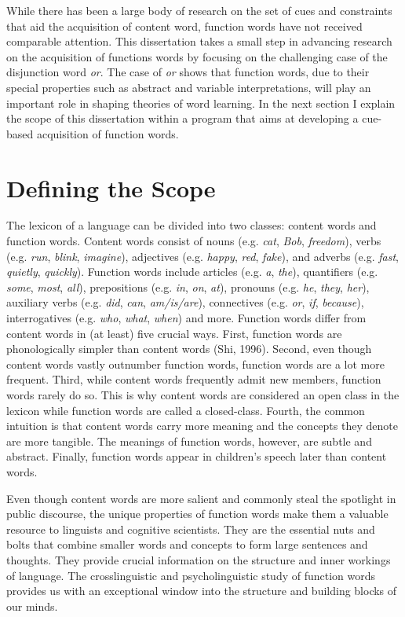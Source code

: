 \documentclass[oneside]{report}
\theoremstyle{definition}
\theoremstyle{definition}
\theoremstyle{definition}
\theoremstyle{remark}
\begin{document}
While there has been a large body of research on the set of cues and
constraints that aid the acquisition of content word, function words
have not received comparable attention. This dissertation takes a small
step in advancing research on the acquisition of functions words by
focusing on the challenging case of the disjunction word \emph{or}. The
case of \emph{or} shows that function words, due to their special
properties such as abstract and variable interpretations, will play an
important role in shaping theories of word learning. In the next section
I explain the scope of this dissertation within a program that aims at
developing a cue-based acquisition of function words.

\section{Defining the Scope}\label{defining-the-scope}

The lexicon of a language can be divided into two classes: content words
and function words. Content words consist of nouns (e.g. \emph{cat},
\emph{Bob}, \emph{freedom}), verbs (e.g. \emph{run}, \emph{blink},
\emph{imagine}), adjectives (e.g. \emph{happy}, \emph{red},
\emph{fake}), and adverbs (e.g. \emph{fast}, \emph{quietly},
\emph{quickly}). Function words include articles (e.g. \emph{a},
\emph{the}), quantifiers (e.g. \emph{some}, \emph{most}, \emph{all}),
prepositions (e.g. \emph{in}, \emph{on}, \emph{at}), pronouns (e.g.
\emph{he}, \emph{they}, \emph{her}), auxiliary verbs (e.g. \emph{did},
\emph{can}, \emph{am/is/are}), connectives (e.g. \emph{or}, \emph{if},
\emph{because}), interrogatives (e.g. \emph{who}, \emph{what},
\emph{when}) and more. Function words differ from content words in (at
least) five crucial ways. First, function words are phonologically
simpler than content words (Shi, 1996). Second, even though content
words vastly outnumber function words, function words are a lot more
frequent. Third, while content words frequently admit new members,
function words rarely do so. This is why content words are considered an
open class in the lexicon while function words are called a
closed-class. Fourth, the common intuition is that content words carry
more meaning and the concepts they denote are more tangible. The
meanings of function words, however, are subtle and abstract. Finally,
function words appear in children's speech later than content words.

Even though content words are more salient and commonly steal the
spotlight in public discourse, the unique properties of function words
make them a valuable resource to linguists and cognitive scientists.
They are the essential nuts and bolts that combine smaller words and
concepts to form large sentences and thoughts. They provide crucial
information on the structure and inner workings of language. The
crosslinguistic and psycholinguistic study of function words provides us
with an exceptional window into the structure and building blocks of our
minds.
\end{document}
